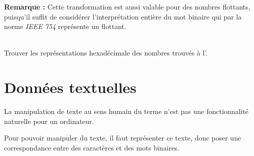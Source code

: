 \documentclass[../../main.tex]{subfiles}
\begin{document}
\textbf{Remarque :} Cette transformation est aussi valable pour des nombres flottants, puisqu'il suffit de considérer l'interprétation entière du mot binaire qui par la norme \textit{IEEE 754} représente un flottant.

\\
Trouver les représentations hexadécimale des nombres trouvés à l'.

\section{Données textuelles} \label{sec:donn_es_textuelles}
La manipulation de texte au sens humain du terme n'est pas une fonctionnalité naturelle pour un ordinateur.
 
Pour pouvoir manipuler du texte, il faut représenter ce texte, donc poser une correspondance entre des caractères et des mots binaires. 
\end{document}
